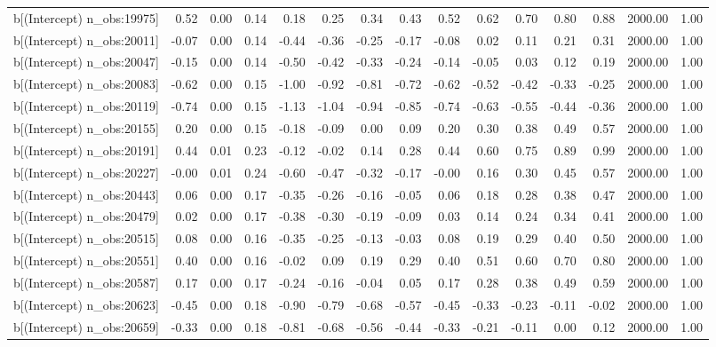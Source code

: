 \begin{table}[ht]
\begin{tabular}{rrrrrrrrrrrrrrr}
  b[(Intercept) n\_obs:19975] & 0.52 & 0.00 & 0.14 & 0.18 & 0.25 & 0.34 & 0.43 & 0.52 & 0.62 & 0.70 & 0.80 & 0.88 & 2000.00 & 1.00 \\ 
  b[(Intercept) n\_obs:20011] & -0.07 & 0.00 & 0.14 & -0.44 & -0.36 & -0.25 & -0.17 & -0.08 & 0.02 & 0.11 & 0.21 & 0.31 & 2000.00 & 1.00 \\ 
  b[(Intercept) n\_obs:20047] & -0.15 & 0.00 & 0.14 & -0.50 & -0.42 & -0.33 & -0.24 & -0.14 & -0.05 & 0.03 & 0.12 & 0.19 & 2000.00 & 1.00 \\ 
  b[(Intercept) n\_obs:20083] & -0.62 & 0.00 & 0.15 & -1.00 & -0.92 & -0.81 & -0.72 & -0.62 & -0.52 & -0.42 & -0.33 & -0.25 & 2000.00 & 1.00 \\ 
  b[(Intercept) n\_obs:20119] & -0.74 & 0.00 & 0.15 & -1.13 & -1.04 & -0.94 & -0.85 & -0.74 & -0.63 & -0.55 & -0.44 & -0.36 & 2000.00 & 1.00 \\ 
  b[(Intercept) n\_obs:20155] & 0.20 & 0.00 & 0.15 & -0.18 & -0.09 & 0.00 & 0.09 & 0.20 & 0.30 & 0.38 & 0.49 & 0.57 & 2000.00 & 1.00 \\ 
  b[(Intercept) n\_obs:20191] & 0.44 & 0.01 & 0.23 & -0.12 & -0.02 & 0.14 & 0.28 & 0.44 & 0.60 & 0.75 & 0.89 & 0.99 & 2000.00 & 1.00 \\ 
  b[(Intercept) n\_obs:20227] & -0.00 & 0.01 & 0.24 & -0.60 & -0.47 & -0.32 & -0.17 & -0.00 & 0.16 & 0.30 & 0.45 & 0.57 & 2000.00 & 1.00 \\ 
  b[(Intercept) n\_obs:20443] & 0.06 & 0.00 & 0.17 & -0.35 & -0.26 & -0.16 & -0.05 & 0.06 & 0.18 & 0.28 & 0.38 & 0.47 & 2000.00 & 1.00 \\ 
  b[(Intercept) n\_obs:20479] & 0.02 & 0.00 & 0.17 & -0.38 & -0.30 & -0.19 & -0.09 & 0.03 & 0.14 & 0.24 & 0.34 & 0.41 & 2000.00 & 1.00 \\ 
  b[(Intercept) n\_obs:20515] & 0.08 & 0.00 & 0.16 & -0.35 & -0.25 & -0.13 & -0.03 & 0.08 & 0.19 & 0.29 & 0.40 & 0.50 & 2000.00 & 1.00 \\ 
  b[(Intercept) n\_obs:20551] & 0.40 & 0.00 & 0.16 & -0.02 & 0.09 & 0.19 & 0.29 & 0.40 & 0.51 & 0.60 & 0.70 & 0.80 & 2000.00 & 1.00 \\ 
  b[(Intercept) n\_obs:20587] & 0.17 & 0.00 & 0.17 & -0.24 & -0.16 & -0.04 & 0.05 & 0.17 & 0.28 & 0.38 & 0.49 & 0.59 & 2000.00 & 1.00 \\ 
  b[(Intercept) n\_obs:20623] & -0.45 & 0.00 & 0.18 & -0.90 & -0.79 & -0.68 & -0.57 & -0.45 & -0.33 & -0.23 & -0.11 & -0.02 & 2000.00 & 1.00 \\ 
  b[(Intercept) n\_obs:20659] & -0.33 & 0.00 & 0.18 & -0.81 & -0.68 & -0.56 & -0.44 & -0.33 & -0.21 & -0.11 & 0.00 & 0.12 & 2000.00 & 1.00 \\ 

\end{tabular}
\end{table}
